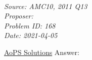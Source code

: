 \SSbreak\\
\emph{Source: AMC10, 2011 Q13}\\
\emph{Proposer: \Pss}\\
\emph{Problem ID: 168}\\
\emph{Date: 2021-04-05}\\
\SSbreak

\bigskip

\begin{solution}\hfil\medskip

\href{https://artofproblemsolving.com/wiki/index.php/2011_AMC_10A_Problems/Problem_13}{AoPS Solutions} Answer: 
\end{solution}\bigskip
